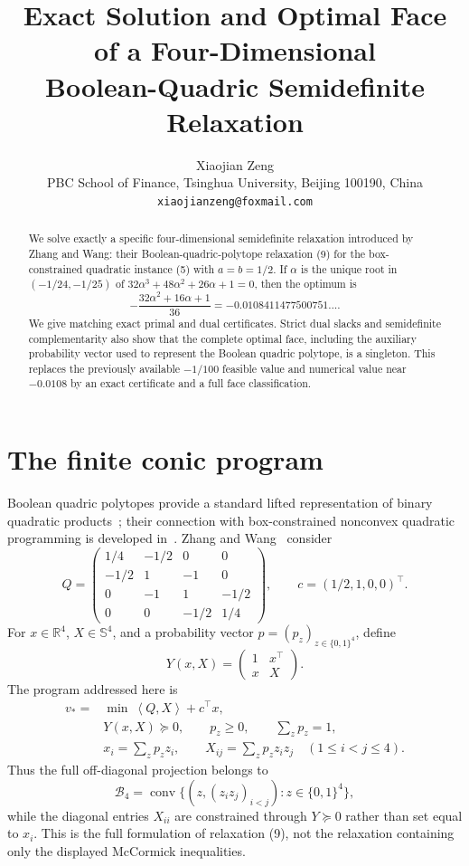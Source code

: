\documentclass[11pt]{article}
\title{Exact Solution and Optimal Face of a Four-Dimensional\\
Boolean-Quadric Semidefinite Relaxation}
\author{Xiaojian Zeng\\
\small PBC School of Finance, Tsinghua University, Beijing 100190, China\\
\small \texttt{xiaojianzeng@foxmail.com}}
\date{}
\newcommand{\R}{\mathbb{R}}
\newcommand{\B}{\mathcal{B}}
\newcommand{\ip}[2]{\left\langle #1,#2\right\rangle}
\begin{document}
\maketitle

\begin{abstract}
We solve exactly a specific four-dimensional semidefinite relaxation introduced
by Zhang and Wang: their Boolean-quadric-polytope relaxation (9) for the
box-constrained quadratic instance (5) with $a=b=1/2$.  If $\alpha$ is the
unique root in $(-1/24,-1/25)$ of
$32\alpha^3+48\alpha^2+26\alpha+1=0$, then the optimum is
\[
 -\frac{32\alpha^2+16\alpha+1}{36}
 =-0.0108411477500751\ldots.
\]
We give matching exact primal and dual certificates.  Strict dual slacks and
semidefinite complementarity also show that the complete optimal face,
including the auxiliary probability vector used to represent the Boolean
quadric polytope, is a singleton.  This replaces the previously available
$-1/100$ feasible value and numerical value near $-0.0108$ by an exact
certificate and a full face classification.
\end{abstract}

\section{The finite conic program}

Boolean quadric polytopes provide a standard lifted representation of binary
quadratic products~\cite{Padberg1989}; their connection with box-constrained
nonconvex quadratic programming is developed in~\cite{BurerLetchford2009}.
Zhang and Wang~\cite{ZhangWang2026} consider
\begin{equation}
Q=\begin{pmatrix}
1/4&-1/2&0&0\\
-1/2&1&-1&0\\
0&-1&1&-1/2\\
0&0&-1/2&1/4
\end{pmatrix},
\qquad c=(1/2,1,0,0)^\top.                                       \tag{1}
\end{equation}
For $x\in\R^4$, $X\in\mathbb{S}^4$, and a probability vector
$p=(p_z)_{z\in\{0,1\}^4}$, define
\[
Y(x,X)=\begin{pmatrix}1&x^\top\\x&X\end{pmatrix}.
\]
The program addressed here is
\begin{equation}
\begin{aligned}
v_*={}&\min\ \ip{Q}{X}+c^\top x,\\
&Y(x,X)\succeq0,\qquad p_z\geq0,\qquad \sum_z p_z=1,\\
&x_i=\sum_z p_z z_i,\qquad
X_{ij}=\sum_z p_z z_i z_j\quad(1\leq i<j\leq4).
\end{aligned}                                                     \tag{2}
\end{equation}
Thus the full off-diagonal projection belongs to
\[
\B_4=\operatorname{conv}\{(z,(z_i z_j)_{i<j}):z\in\{0,1\}^4\},
\]
while the diagonal entries $X_{ii}$ are constrained through $Y\succeq0$
rather than set equal to $x_i$.  This is the full formulation of relaxation
(9), not the relaxation containing only the displayed McCormick inequalities.
\end{document}
